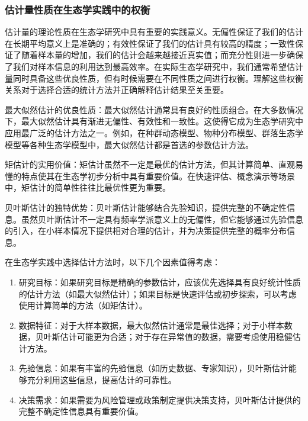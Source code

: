 \documentclass[
  twoside,12pt,fontset=none]{ctexbook}
\begin{document}
\hypertarget{ux4f30ux8ba1ux91cfux6027ux8d28ux5728ux751fux6001ux5b66ux5b9eux8df5ux4e2dux7684ux6743ux8861}{%
\subsubsection{估计量性质在生态学实践中的权衡}\label{ux4f30ux8ba1ux91cfux6027ux8d28ux5728ux751fux6001ux5b66ux5b9eux8df5ux4e2dux7684ux6743ux8861}}

估计量的理论性质在生态学研究中具有重要的实践意义。无偏性保证了我们的估计在长期平均意义上是准确的；有效性保证了我们的估计具有较高的精度；一致性保证了随着样本量的增加，我们的估计会越来越接近真实值；而充分性则进一步确保了我们对样本信息的利用达到最高效率。在实际生态学研究中，我们通常希望估计量同时具备这些优良性质，但有时候需要在不同性质之间进行权衡。理解这些权衡关系对于选择合适的统计方法并正确解释估计结果至关重要。

最大似然估计的优良性质：最大似然估计通常具有良好的性质组合。在大多数情况下，最大似然估计具有渐进无偏性、有效性和一致性。这使得它成为生态学研究中应用最广泛的估计方法之一。例如，在种群动态模型、物种分布模型、群落生态学模型等各种生态学模型中，最大似然估计都是首选的参数估计方法。

矩估计的实用价值：矩估计虽然不一定是最优的估计方法，但其计算简单、直观易懂的特点使其在生态学初步分析中具有重要价值。在快速评估、概念演示等场景中，矩估计的简单性往往比最优性更为重要。

贝叶斯估计的独特优势：贝叶斯估计能够结合先验知识，提供完整的不确定性信息。虽然贝叶斯估计不一定具有频率学派意义上的无偏性，但它能够通过先验信息的引入，在小样本情况下提供相对合理的估计，并为决策提供完整的概率分布信息。

在生态学实践中选择估计方法时，以下几个因素值得考虑：

\begin{enumerate}
\def\labelenumi{\arabic{enumi}.}
\item
  研究目标：如果研究目标是精确的参数估计，应该优先选择具有良好统计性质的估计方法（如最大似然估计）；如果目标是快速评估或初步探索，可以考虑使用计算简单的方法（如矩估计）。
\item
  数据特征：对于大样本数据，最大似然估计通常是最佳选择；对于小样本数据，贝叶斯估计可能更为合适；对于存在异常值的数据，需要考虑使用稳健估计方法。
\item
  先验信息：如果有丰富的先验信息（如历史数据、专家知识），贝叶斯估计能够充分利用这些信息，提高估计的可靠性。
\item
  决策需求：如果需要为风险管理或政策制定提供决策支持，贝叶斯估计提供的完整不确定性信息具有重要价值。
\end{enumerate}
\end{document}
